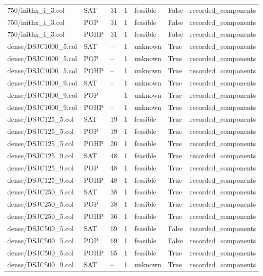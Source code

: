 \begin{table}[htbp]
\begin{tabular}{lllllll}
750/inithx\_i\_3.col & SAT & 31 & 1 & feasible & False & recorded\_components \\
750/inithx\_i\_3.col & POP & 31 & 1 & feasible & False & recorded\_components \\
750/inithx\_i\_3.col & POHP & 31 & 1 & feasible & False & recorded\_components \\
dense/DSJC1000\_5.col & SAT & -- & 1 & unknown & True & recorded\_components \\
dense/DSJC1000\_5.col & POP & -- & 1 & unknown & True & recorded\_components \\
dense/DSJC1000\_5.col & POHP & -- & 1 & unknown & True & recorded\_components \\
dense/DSJC1000\_9.col & SAT & -- & 1 & unknown & True & recorded\_components \\
dense/DSJC1000\_9.col & POP & -- & 1 & unknown & True & recorded\_components \\
dense/DSJC1000\_9.col & POHP & -- & 1 & unknown & True & recorded\_components \\
dense/DSJC125\_5.col & SAT & 19 & 1 & feasible & True & recorded\_components \\
dense/DSJC125\_5.col & POP & 19 & 1 & feasible & True & recorded\_components \\
dense/DSJC125\_5.col & POHP & 20 & 1 & feasible & True & recorded\_components \\
dense/DSJC125\_9.col & SAT & 48 & 1 & feasible & True & recorded\_components \\
dense/DSJC125\_9.col & POP & 48 & 1 & feasible & True & recorded\_components \\
dense/DSJC125\_9.col & POHP & 48 & 1 & feasible & True & recorded\_components \\
dense/DSJC250\_5.col & SAT & 38 & 1 & feasible & True & recorded\_components \\
dense/DSJC250\_5.col & POP & 38 & 1 & feasible & True & recorded\_components \\
dense/DSJC250\_5.col & POHP & 36 & 1 & feasible & True & recorded\_components \\
dense/DSJC500\_5.col & SAT & 69 & 1 & feasible & False & recorded\_components \\
dense/DSJC500\_5.col & POP & 69 & 1 & feasible & False & recorded\_components \\
dense/DSJC500\_5.col & POHP & 65 & 1 & feasible & True & recorded\_components \\
dense/DSJC500\_9.col & SAT & -- & 1 & unknown & True & recorded\_components \\

\end{tabular}
\end{table}
